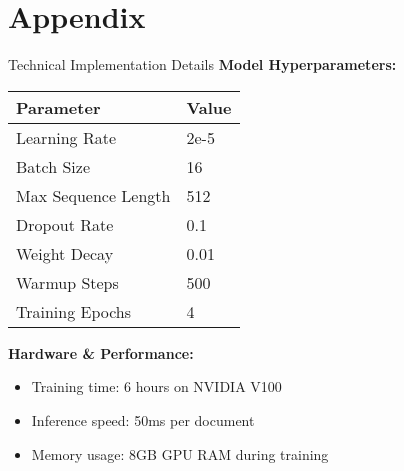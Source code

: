 
\section{Appendix}

\begin{frame}{Technical Implementation Details}
\textbf{Model Hyperparameters:}
\begin{table}[h]
\centering
\begin{tabular}{@{}ll@{}}
\toprule
\textbf{Parameter} & \textbf{Value} \\
\midrule
Learning Rate & 2e-5 \\
Batch Size & 16 \\
Max Sequence Length & 512 \\
Dropout Rate & 0.1 \\
Weight Decay & 0.01 \\
Warmup Steps & 500 \\
Training Epochs & 4 \\
\bottomrule
\end{tabular}
\end{table}

\vspace{0.5cm}
\textbf{Hardware \& Performance:}
\begin{itemize}
    \item Training time: 6 hours on NVIDIA V100
    \item Inference speed: 50ms per document
    \item Memory usage: 8GB GPU RAM during training
\end{itemize}
\end{frame}

